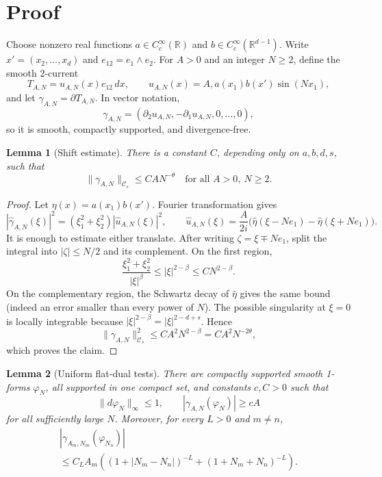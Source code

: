\documentclass[11pt]{article}
\newtheorem{lemma}{Lemma}
\newcommand{\R}{\mathbb{R}}
\newcommand{\Cs}{\mathcal{C}_s}
\begin{document}
\section{Proof}

Choose nonzero real functions
$a\in C_c^\infty(\R)$ and $b\in C_c^\infty(\R^{d-1})$.  Write
$x'=(x_2,\ldots,x_d)$ and $e_{12}=e_1\wedge e_2$.  For $A>0$ and an integer
$N\ge2$, define the smooth 2-current
\[
  T_{A,N}=u_{A,N}(x)e_{12}\,dx,
  \qquad
  u_{A,N}(x)=A,a(x_1)b(x')\sin(Nx_1),
\]
and let $\gamma_{A,N}=\partial T_{A,N}$.  In vector notation,
\[
  \gamma_{A,N}=(\partial_2u_{A,N},-\partial_1u_{A,N},0,\ldots,0),
\]
so it is smooth, compactly supported, and divergence-free.

\begin{lemma}[Shift estimate]\label{shift-lemma}
There is a constant $C$, depending only on $a,b,d,s$, such that
\[
  \|\gamma_{A,N}\|_{\Cs}\le C A N^{-\theta}
  \quad\text{for all }A>0,\ N\ge2.
\]
\end{lemma}

\begin{proof}
Let $\eta(x)=a(x_1)b(x')$.  Fourier transformation gives
\[
 |\widehat{\gamma}_{A,N}(\xi)|^2
 = (\xi_1^2+\xi_2^2)|\widehat u_{A,N}(\xi)|^2,
 \qquad
 \widehat u_{A,N}(\xi)=\frac{A}{2i}
 \bigl(\widehat\eta(\xi-Ne_1)-\widehat\eta(\xi+Ne_1)\bigr).
\]
It is enough to estimate either translate.  After writing
$\zeta=\xi\mp Ne_1$, split the integral into $|\zeta|\le N/2$ and its
complement.  On the first region,
\[
 \frac{\xi_1^2+\xi_2^2}{|\xi|^\beta}
 \le |\xi|^{2-\beta}\le C N^{2-\beta}.
\]
On the complementary region, the Schwartz decay of $\widehat\eta$ gives the
same bound (indeed an error smaller than every power of $N$).  The possible
singularity at $\xi=0$ is locally integrable because
$|\xi|^{2-\beta}=|\xi|^{2-d+s}$.  Hence
\[
 \|\gamma_{A,N}\|_{\Cs}^{2}
 \le C A^2 N^{2-\beta}=C A^2N^{-2\theta},
\]
which proves the claim.
\end{proof}

\begin{lemma}[Uniform flat-dual tests]\label{dual-lemma}
There are compactly supported smooth 1-forms $\varphi_N$, all supported in one
compact set, and constants $c,C>0$ such that
\[
 \|d\varphi_N\|_\infty\le1,
 \qquad
 |\gamma_{A,N}(\varphi_N)|\ge cA
\]
for all sufficiently large $N$.  Moreover, for every $L>0$ and $m\ne n$,
\begin{multline}\label{cross-bound}
 |\gamma_{A_m,N_m}(\varphi_{N_n})|\\
 \le C_L A_m\left((1+|N_m-N_n|)^{-L}
 +(1+N_m+N_n)^{-L}\right).
\end{multline}
\end{lemma}
\end{document}
